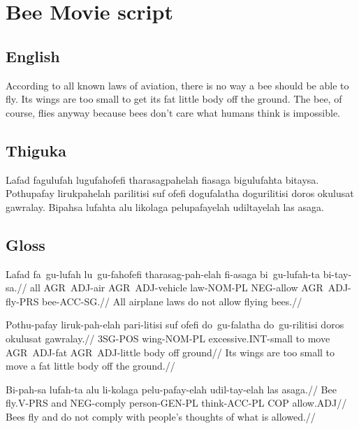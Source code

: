 
\section{Bee Movie script}

\subsection*{English}
According to all known laws of aviation, there is no way a bee should be able to fly.
Its wings are too small to get its fat little body off the ground.
The bee, of course, flies anyway because bees don't care what humans think is impossible.

\subsection*{Thiguka}
Lafad fagulufah lugufahofefi tharasagpahelah fiasaga bigulufahta bitaysa.
Pothupafay lirukpahelah parilitisi suf ofefi dogufalatha dogurilitisi doros okulusat gawralay.
Bipahsa lufahta alu likolaga pelupafayelah udiltayelah las asaga.

\subsection*{Gloss}
\ex
\begingl
\gla  Lafad fa~gu-lufah lu~gu-fahofefi tharasag-pah-elah fi-asaga bi~gu-lufah-ta bi-tay-sa.//
\glb  all AGR~ADJ-air AGR~ADJ-vehicle law-NOM-PL NEG-allow AGR~ADJ-fly-PRS bee-ACC-SG.//
\glft All airplane laws do not allow flying bees.//
\endgl
\xe

\ex
\begingl
\gla  Pothu-pafay liruk-pah-elah  pari-litisi suf ofefi  do~gu-falatha do~gu-rilitisi doros okulusat gawralay.//
\glb  3SG-POS wing-NOM-PL  excessive.INT-small to move  AGR~ADJ-fat AGR~ADJ-little body off ground//
\glft Its wings are too small to move a fat little body off the ground.//
\endgl
\xe

\ex
\begingl
\gla  Bi-pah-sa lufah-ta alu li-kolaga pelu-pafay-elah udil-tay-elah las asaga.//
\glb  Bee fly.V-PRS and NEG-comply person-GEN-PL think-ACC-PL COP allow.ADJ//
\glft Bees fly and do not comply with people's thoughts of what is allowed.//
\endgl
\xe


